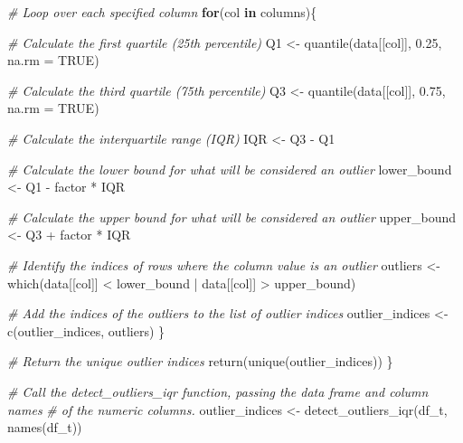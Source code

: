 \documentclass[
  11pt,
]{article}
\newenvironment{Shaded}{}{}
\newcommand{\AttributeTok}[1]{\textcolor[rgb]{0.49,0.56,0.16}{#1}}
\newcommand{\CommentTok}[1]{\textcolor[rgb]{0.38,0.63,0.69}{\textit{#1}}}
\newcommand{\ConstantTok}[1]{\textcolor[rgb]{0.53,0.00,0.00}{#1}}
\newcommand{\ControlFlowTok}[1]{\textcolor[rgb]{0.00,0.44,0.13}{\textbf{#1}}}
\newcommand{\FloatTok}[1]{\textcolor[rgb]{0.25,0.63,0.44}{#1}}
\newcommand{\FunctionTok}[1]{\textcolor[rgb]{0.02,0.16,0.49}{#1}}
\newcommand{\NormalTok}[1]{#1}
\newcommand{\OtherTok}[1]{\textcolor[rgb]{0.00,0.44,0.13}{#1}}
\newcommand{\SpecialCharTok}[1]{\textcolor[rgb]{0.25,0.44,0.63}{#1}}
\begin{document}
\begin{Shaded}
\begin{Highlighting}[]
  \CommentTok{\# Loop over each specified column}
  \ControlFlowTok{for}\NormalTok{(col }\ControlFlowTok{in}\NormalTok{ columns)\{}
    
    \CommentTok{\# Calculate the first quartile (25th percentile)}
\NormalTok{    Q1 }\OtherTok{\textless{}{-}} \FunctionTok{quantile}\NormalTok{(data[[col]], }\FloatTok{0.25}\NormalTok{, }\AttributeTok{na.rm =} \ConstantTok{TRUE}\NormalTok{)}
    
    \CommentTok{\# Calculate the third quartile (75th percentile)}
\NormalTok{    Q3 }\OtherTok{\textless{}{-}} \FunctionTok{quantile}\NormalTok{(data[[col]], }\FloatTok{0.75}\NormalTok{, }\AttributeTok{na.rm =} \ConstantTok{TRUE}\NormalTok{)}
    
    \CommentTok{\# Calculate the interquartile range (IQR)}
\NormalTok{    IQR }\OtherTok{\textless{}{-}}\NormalTok{ Q3 }\SpecialCharTok{{-}}\NormalTok{ Q1}
    
    \CommentTok{\# Calculate the lower bound for what will be considered an outlier}
\NormalTok{    lower\_bound }\OtherTok{\textless{}{-}}\NormalTok{ Q1 }\SpecialCharTok{{-}}\NormalTok{ factor }\SpecialCharTok{*}\NormalTok{ IQR}
    
    \CommentTok{\# Calculate the upper bound for what will be considered an outlier}
\NormalTok{    upper\_bound }\OtherTok{\textless{}{-}}\NormalTok{ Q3 }\SpecialCharTok{+}\NormalTok{ factor }\SpecialCharTok{*}\NormalTok{ IQR}
    
    \CommentTok{\# Identify the indices of rows where the column value is an outlier}
\NormalTok{    outliers }\OtherTok{\textless{}{-}} \FunctionTok{which}\NormalTok{(data[[col]] }\SpecialCharTok{\textless{}}\NormalTok{ lower\_bound }\SpecialCharTok{|}\NormalTok{ data[[col]] }\SpecialCharTok{\textgreater{}}\NormalTok{ upper\_bound)}
    
    \CommentTok{\# Add the indices of the outliers to the list of outlier indices}
\NormalTok{    outlier\_indices }\OtherTok{\textless{}{-}} \FunctionTok{c}\NormalTok{(outlier\_indices, outliers)}
\NormalTok{  \}}
  
  \CommentTok{\# Return the unique outlier indices}
  \FunctionTok{return}\NormalTok{(}\FunctionTok{unique}\NormalTok{(outlier\_indices))}
\NormalTok{\}}

\CommentTok{\# Call the detect\_outliers\_iqr function, passing the data frame and column names }
\CommentTok{\#   of the numeric columns.}
\NormalTok{outlier\_indices }\OtherTok{\textless{}{-}} \FunctionTok{detect\_outliers\_iqr}\NormalTok{(df\_t, }\FunctionTok{names}\NormalTok{(df\_t))}


\end{Highlighting}
\end{Shaded}
\end{document}
